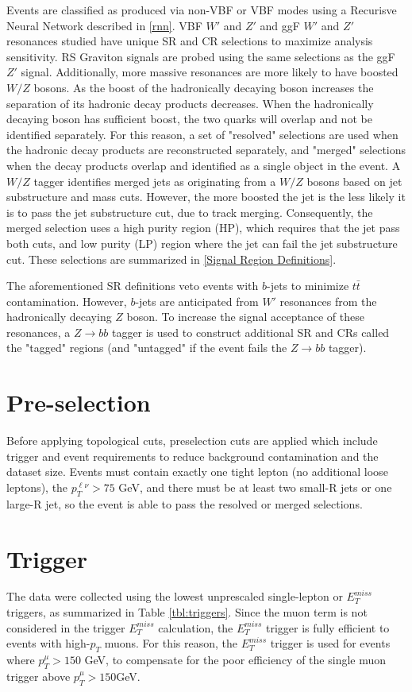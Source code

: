 Events are classified as produced via non-VBF or VBF modes using a Recurisve Neural Network described in \ref{rnn}. VBF $W'$ and $Z'$ and ggF $W'$ and $Z'$ resonances studied have unique SR and CR selections to maximize analysis sensitivity. RS Graviton signals are probed using the same selections as the ggF $Z'$ signal. Additionally, more massive resonances are more likely to have boosted $W/Z$ bosons. As the boost of the hadronically decaying boson increases the separation of its hadronic decay products decreases. When the hadronically decaying boson has sufficient boost, the two quarks will overlap and not be identified separately. For this reason, a set of "resolved" selections are used when the hadronic decay products are reconstructed separately, and "merged" selections when the decay products overlap and identified as a single object in the event. A $W/Z$ tagger identifies merged jets as originating from a $W/Z$ bosons based on jet substructure and mass cuts. However, the more boosted the jet is the less likely it is to pass the jet substructure cut, due to track merging. Consequently, the merged selection uses a high purity region (HP), which requires that the jet pass both cuts, and low purity (LP) region where the jet can fail the jet substructure cut. These selections are summarized in \ref{Signal Region Definitions}.

The aforementioned SR definitions veto events with $b$-jets to minimize $t\bar{t}$ contamination. However, $b$-jets are anticipated from $W'$ resonances from the hadronically decaying $Z$ boson. To increase the signal acceptance of these resonances, a $Z\rightarrow bb$ tagger is used to construct additional SR and CRs called the "tagged" regions (and "untagged" if the event fails the $Z\rightarrow bb$ tagger). 

\section{Pre-selection}
Before applying topological cuts, preselection cuts are applied which include trigger and event requirements to reduce background contamination and the dataset size. Events must contain exactly one tight lepton (no additional loose leptons),  the $p_{T}^{\ell \nu} > 75$ GeV, and there must be at least two small-R jets or one large-R jet, so the event is able to pass the resolved or merged selections.
\section{Trigger}
The data were collected using the lowest unprescaled single-lepton or $E_{T}^{miss}$ triggers, as summarized in Table \ref{tbl:triggers}. Since the muon term is not considered in the trigger $E_{T}^{miss}$ calculation, the $E_{T}^{miss}$ trigger is fully efficient to events with high-$p_{T}$ muons. For this reason, the $E_{T}^{miss}$  trigger is used for events where $p_{T}^{\mu} > 150$ GeV, to compensate for the poor efficiency of the single muon trigger above $p_{T}^{\mu}>150$GeV. 


